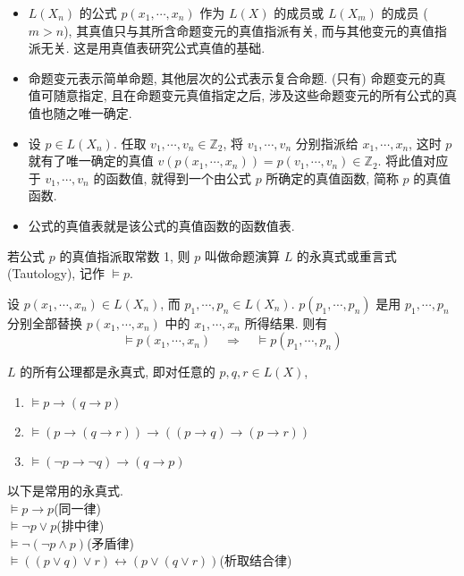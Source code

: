 \documentclass[
    mode=hazy,
    color=blue,
    device=normal,
    lang=cn
]{elegantnote}
\begin{document}
\begin{itemize}
    \item $L(X_n)$ 的公式 $p(x_1,\cdots,x_n)$ 作为 $L(X)$ 的成员或 $L(X_m)$ 的成员 ($m>n$), 其真值只与其所含命题变元的真值指派有关, 而与其他变元的真值指派无关. 这是用真值表研究公式真值的基础.
    \item 命题变元表示简单命题, 其他层次的公式表示复合命题. (只有) 命题变元的真值可随意指定, 且在命题变元真值指定之后, 涉及这些命题变元的所有公式的真值也随之唯一确定.
    \item 设 $p\in L(X_n)$. 任取 $v_1, \cdots, v_n \in\mathbb{Z}_2$, 将 $v_1, \cdots, v_n$ 分别指派给 $x_1, \cdots, x_n$, 这时 $p$ 就有了唯一确定的真值 $v(p(x_1,\cdots,x_n))=p(v_1,\cdots,v_n)\in\mathbb{Z}_2$. 将此值对应于 $v_1, \cdots, v_n$ 的函数值, 就得到一个由公式 $p$ 所确定的真值函数, 简称 $p$ 的真值函数.
    \item 公式的真值表就是该公式的真值函数的函数值表.
\end{itemize}
\begin{definition}[永真式]
    若公式 $p$ 的真值指派取常数 1, 则 $p$ 叫做命题演算 $L$ 的永真式或重言式 (Tautology), 记作 $\vDash p$.
\end{definition}
\begin{theorem}[代换定理]
    设 $p(x_1, \cdots, x_n)\in L(X_n)$, 而 $p_1, \cdots, p_n\in L(X_n)$. $p(p_1, \cdots, p_n)$ 是用 $p_1,\cdots,p_n$ 分别全部替换 $p(x_1,\cdots,x_n)$ 中的 $x_1, \cdots, x_n$ 所得结果. 则有
    $$
        \vDash p(x_1, \cdots, x_n)\quad\Rightarrow\quad \vDash p(p_1,\cdots,p_n)
    $$
\end{theorem}
\begin{proposition}
    $L$ 的所有公理都是永真式, 即对任意的 $p,q,r\in L(X)$,
    \begin{enumerate}[label = $\arabic*^\circ$]
        \item $\vDash p\to(q\to p)$
        \item $\vDash (p\to (q\to r))\to ((p\to q)\to (p\to r))$
        \item $\vDash (\lnot p\to \lnot q)\to (q\to p)$
    \end{enumerate}
\end{proposition}
以下是常用的永真式.\\
$\vDash p\to p$\hfill(同一律)\\
$\vDash \lnot p\lor p$\hfill(排中律)\\
$\vDash \lnot(\lnot p\land p)$\hfill(矛盾律)\\
$\vDash ((p\lor q)\lor r)\leftrightarrow(p\lor(q\lor r))$\hfill(析取结合律)\\
\end{document}
